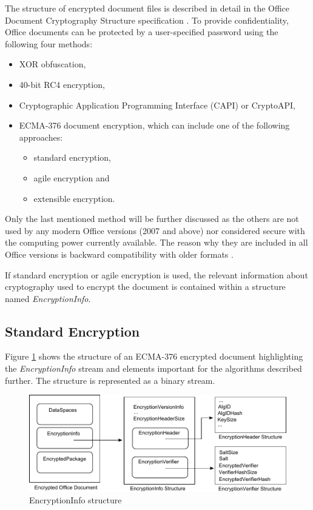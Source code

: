 \documentclass[11pt,oneside]{fithesis2}
\begin{document}
The structure of encrypted document files is described in detail in the Office Document Cryptography Structure specification \cite{msoffcrypto}. To provide confidentiality, Office documents can be protected by a user-specified password using the following four methods:
\begin{itemize}
\setlength\itemsep{0.1em}
\item{XOR obfuscation,}
\item{40-bit RC4 encryption,}
\item{Cryptographic Application Programming Interface (CAPI) or CryptoAPI,}
\item{ECMA-376 document encryption, which can include one of the following approaches: }
	\begin{itemize}
	\setlength\itemsep{0.1em}
	\item{standard encryption,}
	\item{agile encryption and}
	\item{extensible encryption.}
	\end{itemize}
\end{itemize}

Only the last mentioned method will be further discussed as the others are not used by any modern Office versions (2007 and above) nor considered secure with the computing power currently available. The reason why they are included in all Office versions is backward compatibility with older formats \cite{msoffcrypto}.

If standard encryption or agile encryption is used, the relevant information about cryptography used to encrypt the document is contained within a structure named \textit{EncryptionInfo}.

\subsection{Standard Encryption} \label{msoff_standard_enc}

Figure \ref{keys_length} shows the structure of an ECMA-376 encrypted document highlighting the \textit{EncryptionInfo} stream and elements important for the algorithms described further. The structure is represented as a binary stream.

\begin{figure}[ht]
	\centering
	\includegraphics[width=1\textwidth]{figures/ei_struct.pdf}
	\caption{EncryptionInfo structure}
	\label{keys_length}
\end{figure}
\end{document}
